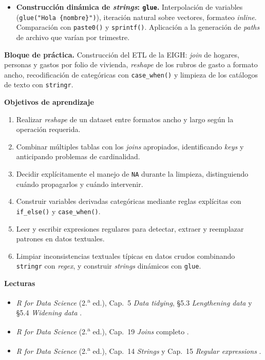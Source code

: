 \documentclass[11pt,letterpaper]{article}
\newcommand{\orange}[1]{{\color{redorange}#1}}
\newcommand{\practica}[1]{%
  \medskip\noindent\textbf{\orange{Bloque de práctica.}} #1\par%
}
\begin{document}
\begin{itemize}[leftmargin=*, itemsep=2pt]
    \item \textbf{Construcción dinámica de \textit{strings}: \texttt{glue}.} Interpolación de variables (\texttt{glue("Hola \{nombre\}")}), iteración natural sobre vectores, formateo \textit{inline}. Comparación con \texttt{paste0()} y \texttt{sprintf()}. Aplicación a la generación de \textit{paths} de archivo que varían por trimestre.
\end{itemize}

\practica{Construcción del ETL de la EIGH: \textit{join} de hogares, personas y gastos por folio de vivienda, \textit{reshape} de los rubros de gasto a formato ancho, recodificación de categóricas con \texttt{case\_when()} y limpieza de los catálogos de texto con \texttt{stringr}.}

\medskip
\noindent\textbf{Objetivos de aprendizaje}
\begin{enumerate}[leftmargin=*, itemsep=1pt]
    \item Realizar \textit{reshape} de un dataset entre formatos ancho y largo según la operación requerida.
    \item Combinar múltiples tablas con los \textit{joins} apropiados, identificando \textit{keys} y anticipando problemas de cardinalidad.
    \item Decidir explícitamente el manejo de \texttt{NA} durante la limpieza, distinguiendo cuándo propagarlos y cuándo intervenir.
    \item Construir variables derivadas categóricas mediante reglas explícitas con \texttt{if\_else()} y \texttt{case\_when()}.
    \item Leer y escribir expresiones regulares para detectar, extraer y reemplazar patrones en datos textuales.
    \item Limpiar inconsistencias textuales típicas en datos crudos combinando \texttt{stringr} con \textit{regex}, y construir \textit{strings} dinámicos con \texttt{glue}.
\end{enumerate}

\medskip
\noindent\textbf{Lecturas}
\begin{itemize}[leftmargin=*, itemsep=1pt]
    \item \textit{R for Data Science} (2.\textsuperscript{a} ed.), Cap.\ 5 \textit{Data tidying}, §5.3 \textit{Lengthening data} y §5.4 \textit{Widening data} \cite{wickham2023r4ds}.
    \item \textit{R for Data Science} (2.\textsuperscript{a} ed.), Cap.\ 19 \textit{Joins} completo \cite{wickham2023r4ds}.
    \item \textit{R for Data Science} (2.\textsuperscript{a} ed.), Cap.\ 14 \textit{Strings} y Cap.\ 15 \textit{Regular expressions} \cite{wickham2023r4ds}.
\end{itemize}
\end{document}
